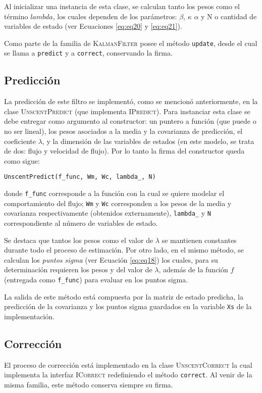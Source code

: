 Al inicializar una instancia de esta clase, se calculan tanto los pesos como el t\'ermino $lambda$, los cuales dependen de los par\'ametros: $\beta$, $\kappa$ $\alpha$ y N o cantidad de variables de estado (ver Ecuaciones \ref{eq:eq20} y \ref{eq:eq21}).
\bigskip

Como parte de la familia de \textsc{KalmanFilter} posee el m\'etodo \texttt{update}, desde el cual se llama a \texttt{predict} y a \texttt{correct}, conservando la firma.
 
\subsection{Predicci\'on}
La predicci\'on de este filtro se implement\'o, como se mencion\'o anteriormente, en la clase \textsc{UnscentPredict} (que implementa \textsc{IPredict}). Para instanciar esta clase se debe entregar como argumento al constructor: un puntero a funci\'on (que puede o no ser lineal), los pesos asociados a la media y la covarianza de predicci\'on, el coeficiente $\lambda$, y la dimensi\'on de las variables de estados (en este modelo, se trata de dos: flujo y velocidad de 
flujo). Por lo tanto la firma del constructor queda como sigue:
\bigskip
\begin{center}
\texttt{UnscentPredict(f\_func, Wm, Wc, lambda\_, N)}
\end{center}
\bigskip

donde \texttt{f\_func} corresponde a la funci\'on con la cual se quiere modelar el comportamiento del flujo; \texttt{Wm} y \texttt{Wc}  corresponden a los pesos de la media y covarianza respectivamente (obtenidos externamente), \texttt{lambda\_} y \texttt{N} correspondiente al n\'umero de variables de estado.
\bigskip

Se destaca que tantos los pesos como el valor de $\lambda$ se mantienen constantes durante todo el proceso de estimaci\'on. Por otro lado, en el mismo m\'etodo, se calculan los \textit{puntos sigma} (ver Ecuaci\'on \ref{eq:eq18}) los cuales, para su determinaci\'on requieren los pesos y del valor de $\lambda$, adem\'as de la funci\'on  $f$ (entregada como \texttt{f\_func}) para evaluar en los puntos sigma.
\bigskip

La salida de este m\'etodo est\'a compuesta por la matriz de estado predicha, la predicci\'on de la covarianza y los puntos sigma guardados en la variable \texttt{Xs} de la implementaci\'on.

\subsection{Correcci\'on}
El proceso de correcci\'on est\'a implementado en la clase \textsc{UnscentCorrect} la cual implementa la interfaz \textsc{ICorrect} redefiniendo el m\'etodo \texttt{correct}. Al venir de la misma familia, este m\'etodo conserva siempre su firma. 
\bigskip

